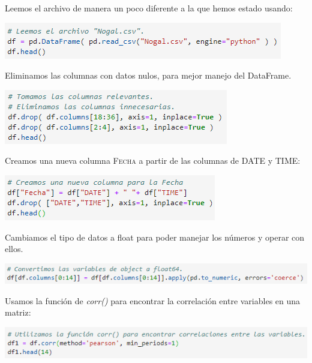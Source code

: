 \documentclass{article}
\begin{document}
Leemos el archivo de manera un poco diferente a la que hemos estado usando:

\begin{center}
    \includegraphics[scale = 0.7]{read.png}
\end{center}

Eliminamos las columnas con datos nulos, para mejor manejo del DataFrame.

\begin{center}
    \includegraphics[scale = 0.7]{unnamed.png}
\end{center}
\clearpage

Creamos una nueva columna \textsc{Fecha} a partir de las columnas de \textsc{DATE} y \textsc{TIME}:

\begin{center}
    \includegraphics[scale = 0.7]{Fecha.png}
\end{center}

Cambiamos el tipo de datos a float para poder manejar los números y operar con ellos.

\begin{center}
    \includegraphics[scale = 0.7]{float.png}
\end{center}

Usamos la función de \textit{corr()} para encontrar la correlación entre variables en una matriz:
\begin{center}
    \includegraphics[scale = 0.7]{corr.png}
\end{center}
\end{document}
